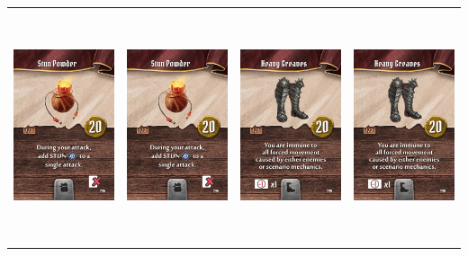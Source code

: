\documentclass{minimal}
\begin{document}
{\begin{longtable}{llll}
\includegraphics[width=44mm,height=68mm]{./15-21/gh-021-stun-powder.png} &
\includegraphics[width=44mm,height=68mm]{./15-21/gh-021-stun-powder.png} &
\includegraphics[width=44mm,height=68mm]{./22-28/gh-022-heavy-greaves.png} &
\includegraphics[width=44mm,height=68mm]{./22-28/gh-022-heavy-greaves.png}\\ 

\end{longtable}}
\end{document}
